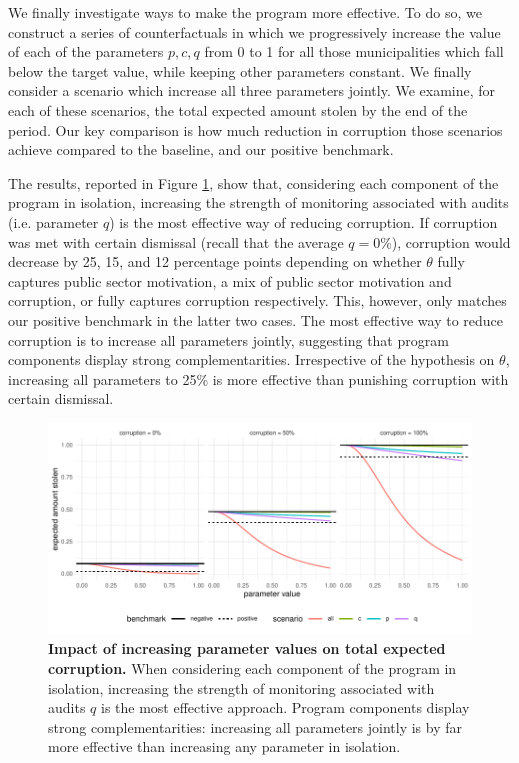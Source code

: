 {We finally investigate ways to make the program more effective. To do so, we construct a series of counterfactuals in which we progressively increase the value of each of the parameters $p, c, q$ from 0 to 1 for all those municipalities which fall below the target value, while keeping other parameters constant. We finally consider a scenario which increase all three parameters jointly. We examine, for each of these scenarios, the total expected amount stolen by the end of the period. Our key comparison is how much reduction in corruption those scenarios achieve compared to the baseline, and our positive benchmark. 

The results, reported in Figure \ref{fig:counterfactuals2}, show that, considering each component of the program in isolation, increasing the strength of monitoring associated with  audits (i.e. parameter $q$) is the most effective way of reducing corruption. If corruption was met with certain dismissal (recall that the average $q = 0\%$), corruption would decrease by 25, 15, and 12 percentage points depending on whether $\theta$ fully captures public sector motivation, a mix of public sector motivation and corruption, or fully captures corruption respectively. This, however, only matches our positive benchmark in the latter two cases. The most effective way to reduce corruption is to increase all parameters jointly, suggesting that program components display strong complementarities. Irrespective of the hypothesis on $\theta$, increasing all parameters to 25\% is more effective than punishing corruption with certain dismissal. 

\begin{figure}[H]
    \centering
    \includegraphics{chapters/chapter_2/figures/counterfactuals_effectiveness.pdf}
    \caption{{\bf Impact of increasing parameter values on total expected corruption.} When considering each component of the program in isolation, increasing the strength of monitoring associated with audits $q$ is the most effective approach. Program components display strong complementarities: increasing all parameters jointly is by far more effective than increasing any parameter in isolation.}
    \label{fig:counterfactuals2}
\end{figure}

}

